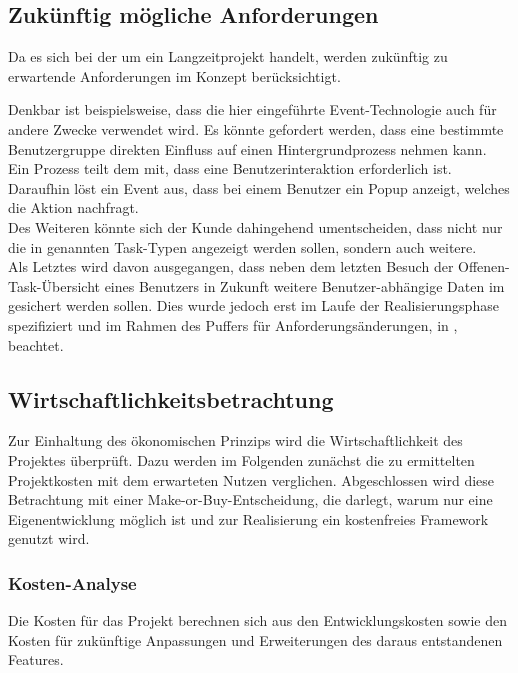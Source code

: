 \subsection{Zukünftig mögliche Anforderungen} 
\label{sub:Zukünftig mögliche Anforderungen}
Da es sich bei der  um ein Langzeitprojekt handelt, werden zukünftig zu erwartende Anforderungen im Konzept
berücksichtigt. 

Denkbar ist beispielsweise, dass die hier eingeführte Event-Technologie auch für andere Zwecke verwendet wird. Es könnte \zB
gefordert werden, dass eine bestimmte Benutzergruppe direkten Einfluss auf einen Hintergrundprozess nehmen kann. Ein Prozess
teilt dem  mit, dass eine Benutzerinteraktion erforderlich ist. Daraufhin löst  ein Event aus,
dass bei einem Benutzer ein Popup anzeigt, welches die Aktion nachfragt. \\
Des Weiteren könnte sich der Kunde dahingehend umentscheiden, dass nicht nur die in  genannten
Task-Typen angezeigt werden sollen, sondern auch weitere.\\
Als Letztes wird davon ausgegangen, dass neben dem letzten Besuch der Offenen-Task-Übersicht eines Benutzers in Zukunft weitere
Benutzer-abhängige Daten im  gesichert werden sollen. Dies wurde jedoch erst im Laufe der Realisierungsphase
spezifiziert und im Rahmen des Puffers für Anforderungsänderungen, in , beachtet.

\subsection{Wirtschaftlichkeitsbetrachtung} 
\label{sub:Wirtschaftlichkeitsbetrachtung}
Zur Einhaltung des ökonomischen Prinzips wird die Wirtschaftlichkeit des Projektes überprüft. Dazu werden im Folgenden zunächst
die zu ermittelten Projektkosten mit dem erwarteten Nutzen verglichen. Abgeschlossen wird diese Betrachtung mit einer
Make-or-Buy-Entscheidung, die darlegt, warum nur eine Eigenentwicklung möglich ist und zur Realisierung ein kostenfreies Framework
genutzt wird.

\subsubsection{Kosten-Analyse} 
\label{subsub:Kosten-Analyse}
Die Kosten für das Projekt berechnen sich aus den Entwicklungskosten sowie den Kosten für zukünftige Anpassungen und Erweiterungen
des daraus entstandenen Features.

